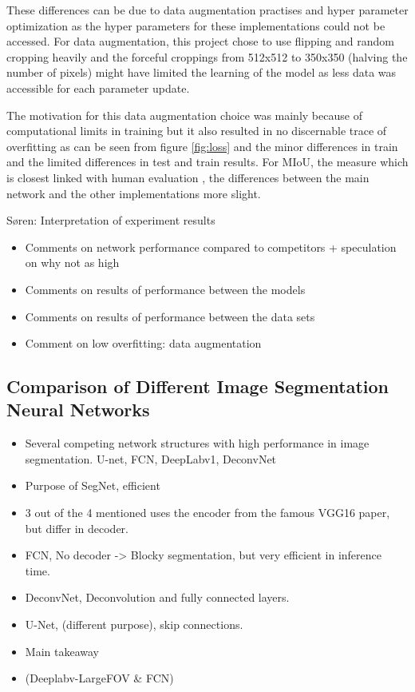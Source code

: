 \documentclass{article}
\begin{document}
These differences can be due to data augmentation practises and hyper parameter optimization as the hyper parameters for these implementations could not be accessed. For data augmentation, this project chose to use flipping and random cropping heavily and the forceful croppings from 512x512 to 350x350 (halving the number of pixels) might have limited the learning of the model as less data was accessible for each parameter update. 

The motivation for this data augmentation choice was mainly because of computational limits in training but it also resulted in no discernable trace of overfitting as can be seen from figure \eqref{fig:loss} and the minor differences in train and the limited differences in test and train results. For MIoU, the measure which is closest linked with human evaluation \cite{eval}, the differences between the main network and the other implementations more slight. 


Søren: Interpretation of experiment results

\begin{itemize}
\item Comments on network performance compared to competitors + speculation on why not as high
\item Comments  on results of performance between the models
\item Comments on results of performance between the data sets
\item Comment on low overfitting: data augmentation
\end{itemize}


\label{sec:foot}
\subsection{Comparison of Different Image Segmentation Neural Networks}
\begin{itemize}
	\item Several competing network structures with high performance in image segmentation. U-net, FCN, DeepLabv1, DeconvNet
	\item Purpose of SegNet, efficient
	\item 3 out of the 4 mentioned uses the encoder from the famous VGG16 paper, but differ in decoder.
	\item FCN, No decoder -> Blocky segmentation, but very efficient in inference time.
	\item DeconvNet, Deconvolution and fully connected layers. 
	\item U-Net, (different purpose), skip connections. 
	\item Main takeaway  
	\item (Deeplabv-LargeFOV \& FCN)
\end{itemize}
	
\end{document}
